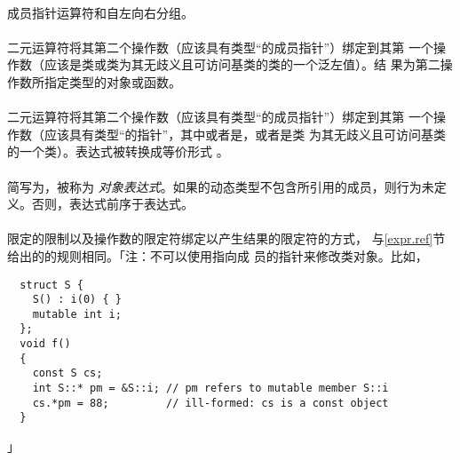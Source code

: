 \paragraph{}
成员指针运算符\tm{->*}和自左向右分组。


\paragraph{}
二元运算符将其第二个操作数（应该具有类型``的成员指针''）绑定到其第
一个操作数（应该是类或类为其无歧义且可访问基类的类的一个泛左值）。结
果为第二操作数所指定类型的对象或函数。

\paragraph{}
二元运算符\tm{->*}将其第二个操作数（应该具有类型``的成员指针''）绑定到其第
一个操作数（应该具有类型``的指针''，其中或者是，或者是类
为其无歧义且可访问基类的一个类）。表达式被转换成等价形式
。

\paragraph{}
简写为，被称为
\textit{对象表达式}。如果的动态类型不包含所引用的成员，则行为未定
义。否则，表达式前序于表达式。

\paragraph{}
限定的限制以及操作数的限定符绑定以产生结果的限定符的方式，
与\ref{expr.ref}节给出的的规则相同。「注：不可以使用指向成
员的指针来修改类对象。比如，
\begin{lstlisting}
  struct S {
    S() : i(0) { }
    mutable int i;
  };
  void f()
  {
    const S cs;
    int S::* pm = &S::i; // pm refers to mutable member S::i
    cs.*pm = 88;         // ill-formed: cs is a const object
  }
\end{lstlisting}」

